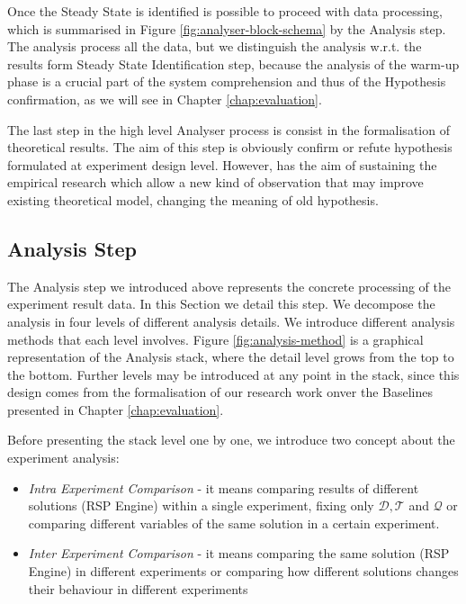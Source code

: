 Once the Steady State is identified is possible to proceed with data processing, which is summarised in Figure \ref{fig:analyser-block-schema} by the Analysis step. The analysis process all the data, but we distinguish the analysis w.r.t. the results form Steady State Identification step, because the analysis of the warm-up phase is a crucial part of the system comprehension and thus of the Hypothesis confirmation, as we will see in Chapter \ref{chap:evaluation}.


The last step in the high level Analyser process is consist in the formalisation of theoretical results. The aim of this step is obviously confirm or refute hypothesis formulated at experiment design level. However, \name has the aim of sustaining the empirical research which allow a new kind of observation that may improve existing theoretical model, changing the meaning of old hypothesis.

\subsection{Analysis Step}

The Analysis step we introduced above represents the concrete processing of the experiment result data. In this Section we detail this step. We decompose the analysis in four levels of different analysis details. We  introduce different analysis methods that each level involves. Figure \ref{fig:analysis-method} is a graphical representation of the Analysis stack, where the detail level grows from the top to the bottom. Further levels may be introduced at any point in the stack, since this design comes from the formalisation of our research work onver the Baselines presented in Chapter \ref{chap:evaluation}.

\pagebreak

Before presenting the stack level one by one, we introduce two concept about the experiment analysis:
\begin{itemize}
\item \textit{Intra Experiment Comparison} -  it means comparing results of different solutions (RSP Engine) within a single experiment, fixing only $\mathcal{D}, \mathcal{T} $ and $\mathcal{Q}$ or comparing different variables of the same solution  in a certain experiment.
\item \textit{Inter Experiment Comparison} -  it means comparing the same solution (RSP Engine) in different experiments or comparing how different solutions changes their behaviour in different experiments
\end{itemize}

